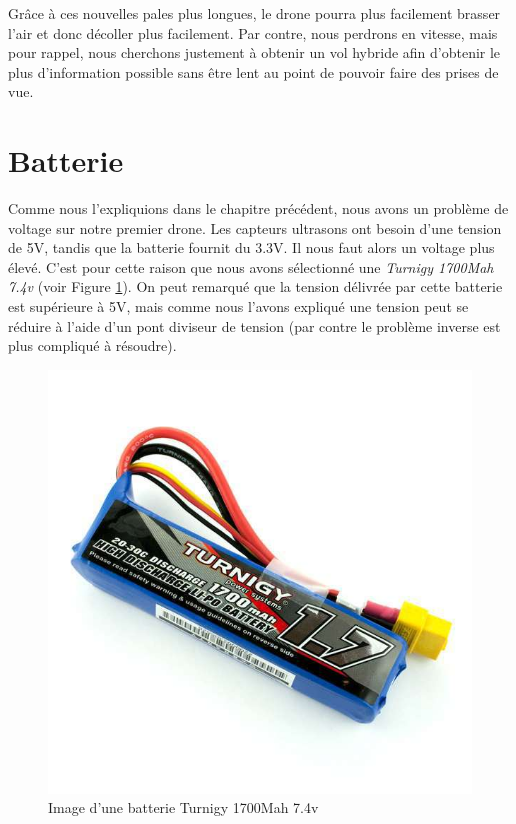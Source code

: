 \documentclass[a4paper,10pt]{report}
\begin{document}
      Grâce à ces nouvelles pales plus longues, le drone pourra plus facilement 
brasser l'air et donc décoller plus facilement. Par contre, nous perdrons en 
vitesse, mais pour rappel, nous cherchons justement à obtenir un vol hybride 
afin d'obtenir le plus d'information possible sans être lent au point de 
pouvoir faire des prises de vue.

    \section{Batterie}
      Comme nous l'expliquions dans le chapitre précédent, nous avons un 
problème de voltage sur notre premier drone. Les capteurs ultrasons ont besoin 
d'une tension de 5V, tandis que la batterie fournit du 3.3V. Il nous faut alors 
un voltage plus élevé. C'est pour cette raison que nous avons sélectionné une 
\textit{Turnigy 1700Mah 7.4v} (voir Figure \ref{batterie}). On peut remarqué 
que la tension délivrée par cette batterie est supérieure à 5V, mais comme nous 
l'avons expliqué une tension peut se réduire à l'aide d'un pont diviseur de 
tension (par contre le problème inverse est plus compliqué à résoudre).

      \begin{figure}[htbp]
	\centering
	\includegraphics[scale = 0.3]{img/nouvellebatterie.jpg}
	\caption{Image d'une batterie Turnigy 1700Mah 7.4v}
	\label{batterie}
      \end{figure}
\end{document}
